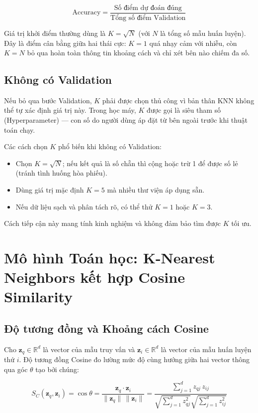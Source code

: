 \documentclass[12pt,a4paper]{article}
\begin{document}
\begin{equation}
    \text{Accuracy} = \frac{\text{Số điểm dự đoán đúng}}{\text{Tổng số điểm Validation}}
\end{equation}

Giá trị khởi điểm thường dùng là $K = \sqrt{N}$ (với $N$ là tổng số mẫu huấn luyện). Đây là điểm cân bằng giữa hai thái cực: $K = 1$ quá nhạy cảm với nhiễu, còn $K = N$ bỏ qua hoàn toàn thông tin khoảng cách và chỉ xét bên nào chiếm đa số.

\subsection{Không có Validation}

Nếu bỏ qua bước Validation, $K$ phải được chọn thủ công vì bản thân KNN không thể tự xác định giá trị này. Trong học máy, $K$ được gọi là siêu tham số (Hyperparameter) — con số do người dùng áp đặt từ bên ngoài trước khi thuật toán chạy.

Các cách chọn $K$ phổ biến khi không có Validation:
\begin{itemize}
    \item Chọn $K = \sqrt{N}$; nếu kết quả là số chẵn thì cộng hoặc trừ 1 để được số lẻ (tránh tình huống hòa phiếu).
    \item Dùng giá trị mặc định $K = 5$ mà nhiều thư viện áp dụng sẵn.
    \item Nếu dữ liệu sạch và phân tách rõ, có thể thử $K = 1$ hoặc $K = 3$.
\end{itemize}

Cách tiếp cận này mang tính kinh nghiệm và không đảm bảo tìm được $K$ tối ưu.


\section{Mô hình Toán học: K-Nearest Neighbors kết hợp Cosine Similarity}
\subsection{Độ tương đồng và Khoảng cách Cosine}

Cho $\mathbf{z}_q \in \mathbb{R}^d$ là vector của mẫu truy vấn và
$\mathbf{z}_i \in \mathbb{R}^d$ là vector của mẫu huấn luyện thứ $i$.
Độ tương đồng Cosine đo lường mức độ cùng hướng giữa hai vector thông
qua góc $\theta$ tạo bởi chúng:

\begin{equation}
    S_C(\mathbf{z}_q, \mathbf{z}_i)
    = \cos\theta
    = \frac{\mathbf{z}_q \cdot \mathbf{z}_i}
           {\|\mathbf{z}_q\|\,\|\mathbf{z}_i\|}
    = \frac{\displaystyle\sum_{j=1}^{d} z_{qj}\,z_{ij}}
           {\displaystyle\sqrt{\sum_{j=1}^{d} z_{qj}^2}
            \sqrt{\sum_{j=1}^{d} z_{ij}^2}}
\end{equation}
\end{document}
